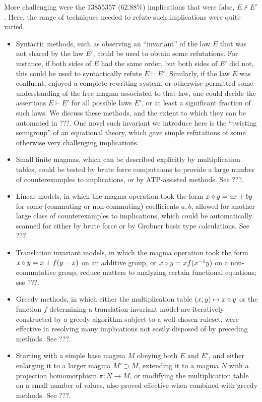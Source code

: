 More challenging were the $13855357$ ($62.88\%$) implications that were false, $E \not \vdash E'$.  Here, the range of techniques needed to refute such implications were quite varied.
\begin{itemize}
    \item Syntactic methods, such as observing an ``invariant'' of the law $E$ that was not shared by the law $E'$, could be used to obtain some refutations.  For instance, if both sides of $E$ had the same order, but both sides of $E'$ did not, this could be used to syntactically refute $E \vdash E'$.  Similarly, if the law $E$ was confluent, enjoyed a complete rewriting system, or otherwise permitted some understanding of the free magma associated to that law, one could decide the assertions $E \vdash E'$ for all possible laws $E'$, or at least a significant fraction of such laws.  We discuss these methods, and the extent to which they can be automated in ???.  One novel such invariant we introduce here is the ``twisting semigroup'' of an equational theory, which gave simple refutations of some otherwise very challenging implications.
    \item Small finite magmas, which can be described explicitly by multiplication tables, could be tested by brute force computaions to provide a large number of counterexamples to implications, or by ATP-assisted methods. See ???.
    \item Linear models, in which the magma operation took the form $x \diamond y = ax + by$ for some (commuting or non-commuting) coefficients $a,b$, allowed for another large class of counterexamples to implications, which could be automatically scanned for either by brute force or by Grobner basis type calculations.  See ???.
    \item Translation invariant models, in which the magma operation took the form $x \diamond y = x + f(y-x)$ on an additive group, or $x \diamond y = x f(x^{-1} y)$ on a non-commutative group, reduce matters to analyzing certain functional equations; see ???.
    \item Greedy methods, in which either the multiplication table $(x,y) \mapsto x \diamond y$ or the function $f$ determining a translation-invariant model are iteratively constructed by a greedy algorithm subject to a well-chosen ruleset, were effective in resolving many implications not easily disposed of by preceding methods.  See ???.
    \item Starting with a simple base magma $M$ obeying both $E$ and $E'$, and either enlarging it to a larger magma $M' \supset M$, extending it to a magma $N$ with a projection homomorphism $\pi: N \to M$, or modifying the multiplication table on a small number of values, also proved effective when combined with greedy methods.  See ???.

\end{itemize}
